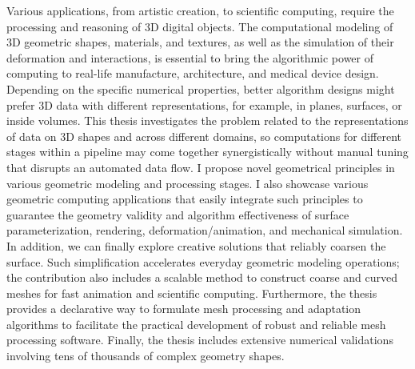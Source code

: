 Various applications, from artistic creation, to scientific computing, require the processing and reasoning of 3D digital objects.
The computational modeling of 3D geometric shapes, materials, and textures, as well as the simulation of their deformation and interactions, is essential to bring the algorithmic power of computing to real-life manufacture, architecture, and medical device design.
Depending on the specific numerical properties, better algorithm designs might prefer 3D data with different representations, for example, in planes, surfaces, or inside volumes.
This thesis investigates the problem related to the representations of data on 3D shapes and across different domains,
so computations for different stages within a pipeline may come together synergistically without manual tuning that disrupts an automated data flow.
I propose novel geometrical principles in various geometric modeling and processing stages.
I also showcase various geometric computing applications that easily integrate such principles to guarantee the geometry validity and algorithm effectiveness of surface parameterization, rendering, deformation/animation, and mechanical simulation.
In addition, we can finally explore creative solutions that reliably coarsen the surface. Such simplification accelerates everyday geometric modeling operations; the contribution also includes a scalable method to construct coarse and curved meshes for fast animation and scientific computing.
Furthermore, the thesis provides a declarative way to formulate mesh processing and adaptation algorithms to facilitate the practical development of robust and reliable mesh processing software.
Finally, the thesis includes extensive numerical validations involving tens of thousands of complex geometry shapes. 